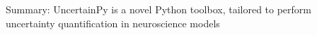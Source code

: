\documentclass[presentation]{beamer}
\begin{document}
\begin{frame}{Summary: UncertainPy is a novel Python toolbox, tailored to perform uncertainty quantification in neuroscience models}
\begin{columns}
 \end{columns}




\pause
{}



\end{frame}
\end{document}
